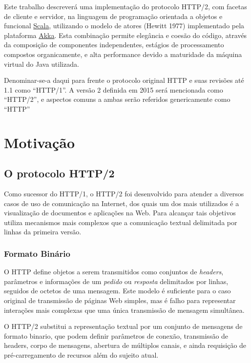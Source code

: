 \documentclass[12pt,a4paper,openright,twoside,english,brazil,]{abntex2}	%
\begin{document}
Este trabalho descreverá uma implementação do protocolo HTTP/2, com
facetas de cliente e servidor, na linguagem de programação orientada a
objetos e funcional \href{http://scala-lang.org}{Scala}, utilizando o
modelo de atores (Hewitt 1977) implementado pela plataforma
\href{http://akka.io}{Akka}. Esta combinação permite elegância e coesão
do código, através da composição de componentes independentes, estágios
de processamento compostos organicamente, e alta performance devido a
maturidade da máquina virtual do Java utilizada.

Denominar-se-a daqui para frente o protocolo original HTTP e suas
revisões até 1.1 como ``HTTP/1''. A versão 2 definida em 2015 será
mencionada como ``HTTP/2'', e aspectos comuns a ambas serão referidos
genericamente como ``HTTP''

\section{Motivação}\label{motivauxe7uxe3o}

\subsection{O protocolo HTTP/2}\label{o-protocolo-http2}

Como sucessor do HTTP/1, o HTTP/2 foi desenvolvido para atender a
diversos casos de uso de comunicação na Internet, dos quais um dos mais
utilizados é a visualização de documentos e aplicações na Web. Para
alcançar tais objetivos utiliza mecanismos mais complexos que a
comunicação textual delimitada por linhas da primeira versão.

\subsubsection{Formato Binário}\label{formato-binuxe1rio}

O HTTP define objetos a serem transmitidos como conjuntos de
\emph{headers}, parâmetros e informações de um \emph{pedido} ou
\emph{resposta} delimitados por linhas, seguidos de octetos de uma
mensagem. Este modelo é suficiente para o caso original de transmissão
de páginas Web simples, mas é falho para representar interações mais
complexas que uma única transmissão de mensagem simultânea.

O HTTP/2 substitui a representação textual por um conjunto de mensagens
de formato binario, que podem definir parâmetros de conexão, transmissão
de headers, corpo de mensagens, abertura de múltiplos canais, e ainda
requisição de pré-carregamento de recursos além do sujeito atual.
\end{document}
